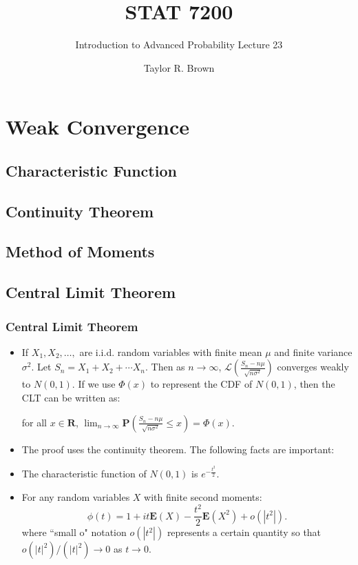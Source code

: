 \documentclass[handout]{beamer}
\title{STAT 7200}
\subtitle{Introduction to Advanced Probability \newline Lecture 23}
\author{Taylor R. Brown}
\institute{}
\date{}
\newcommand{\BP}{\mathbf{P}}
\newcommand{\BE}{\mathbf{E}}
\begin{document}
\frame{\titlepage}


\section[Outline]{}
\frame{\tableofcontents}



\section{Weak Convergence}
\subsection{Characteristic Function}
\subsection{Continuity Theorem}  
 \subsection{Method of Moments} 
 \subsection{Central Limit Theorem}
 
    \frame
{
  \frametitle{Central Limit Theorem}

 \begin{itemize}
\item<1-> []\begin{Theorem} If $X_1, X_2, \ldots, $ are i.i.d. random variables with finite mean $\mu$ and finite variance $\sigma^2$. Let $S_n=X_1+X_2+\cdots X_n$. Then as $n\rightarrow \infty$, $\mathcal{L}(\frac{S_n-n\mu}{\sqrt{n\sigma^2}})$ converges weakly to $N(0,1)$. If we use $\Phi(x)$ to represent the CDF of $N(0,1)$, then the CLT can be written as: 

for all $x\in \mathbf{R}$, $\lim_{n\rightarrow \infty} \BP(\frac{S_n-n\mu}{\sqrt{n\sigma^2}}\leq x)=\Phi(x).$
\end{Theorem}

\item<2-> The proof uses the continuity theorem. The following facts are important:

\item<3->[1)] The characteristic function of $N(0,1)$ is $e^{-\frac{t^2}{2}}$.
\item<4->[2)] For any random variables $X$ with finite second moments: 
$$\phi(t)=1+it\BE(X)-\frac{t^2}{2} \BE(X^2)+o(|t^2|).$$
\noindent where ``small o" notation $o(|t^2|)$ represents a certain quantity so that $o(|t|^2)/(|t|^2)\rightarrow 0$ as $t\rightarrow 0$. 

\end{itemize}
 }
 
\end{document}
